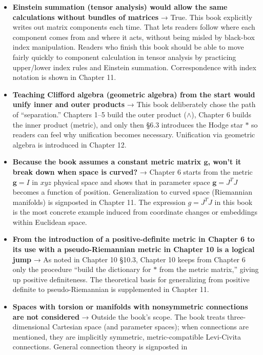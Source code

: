 \begin{itemize}
\item
  \textbf{Einstein summation (tensor analysis) would allow the same calculations without bundles of matrices}
  → True. This book explicitly writes out matrix components each time.
  That lets readers follow where each component comes from and where it
  acts, without being misled by black-box index manipulation. Readers
  who finish this book should be able to move fairly quickly to
  component calculation in tensor analysis by practicing upper/lower
  index rules and Einstein summation. Correspondence with index notation
  is shown in Chapter 11.
\item
  \textbf{Teaching Clifford algebra (geometric algebra) from the start would unify inner and outer products}
  → This book deliberately chose the path of ``separation.'' Chapters
  1--5 build the outer product (\(\wedge\)), Chapter 6 builds the inner
  product (metric), and only then §6.3 introduces the Hodge star
  \(\ast\) so readers can feel why unification becomes necessary.
  Unification via geometric algebra is introduced in Chapter 12.
\item
  \textbf{Because the book assumes a constant metric matrix $\mathbf{g}$, won't it break down when space is curved?}
  → Chapter 6 starts from the metric \(\mathbf{g}=I\) in \(xyz\)
  physical space and shows that in parameter space \(\mathbf{g}=J^T J\)
  becomes a function of position. Generalization to curved space
  (Riemannian manifolds) is signposted in Chapter 11. The expression
  \(g=J^T J\) in this book is the most concrete example induced from
  coordinate changes or embeddings within Euclidean space.
\item
  \textbf{From the introduction of a positive-definite metric in Chapter 6 to its use with a pseudo-Riemannian metric in Chapter 10 is a logical jump}
  → As noted in Chapter 10 §10.3, Chapter 10 keeps from Chapter 6 only
  the procedure ``build the dictionary for \(\ast\) from the metric
  matrix,'' giving up positive definiteness. The theoretical basis for
  generalizing from positive definite to pseudo-Riemannian is
  supplemented in Chapter 11.
\item
  \textbf{Spaces with torsion or manifolds with nonsymmetric connections are not considered}
  → Outside the book's scope. The book treats three-dimensional
  Cartesian space (and parameter spaces); when connections are
  mentioned, they are implicitly symmetric, metric-compatible
  Levi-Civita connections. General connection theory is signposted in

\end{itemize}
